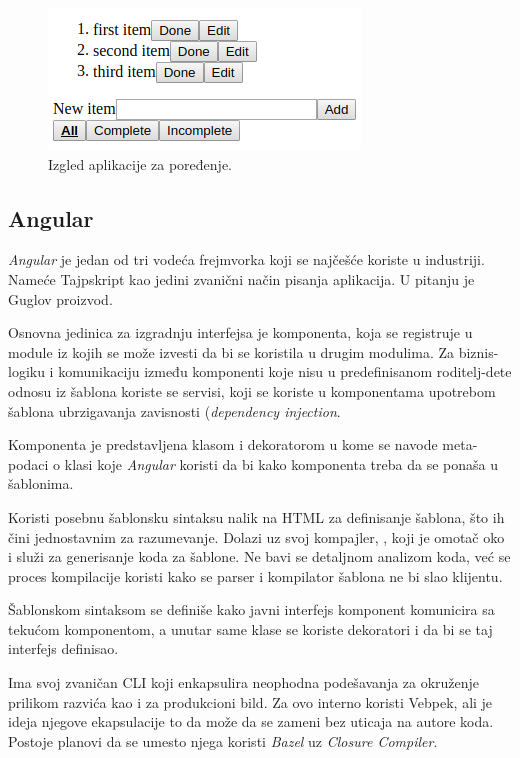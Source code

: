 \begin{figure}
  \centering
  \includegraphics[scale=0.5]{ch06/app.png}
  \caption{Izgled aplikacije za poređenje.}
  \label{fig:izgled-app}
\end{figure}

\subsection{Angular}

\textsl{Angular} je jedan od tri vodeća frejmvorka koji se najčešće koriste u industriji.
Nameće Tajpskript kao jedini zvanični način pisanja aplikacija.
U pitanju je Guglov proizvod.

Osnovna jedinica za izgradnju interfejsa je komponenta, koja se registruje u module iz kojih se može izvesti da bi se koristila u drugim modulima.
Za biznis-logiku i komunikaciju između komponenti koje nisu u predefinisanom roditelj-dete odnosu iz šablona koriste se servisi, koji se koriste u komponentama upotrebom šablona ubrzigavanja zavisnosti (\textsl{dependency injection}.

Komponenta je predstavljena klasom i dekoratorom  u kome se navode meta-podaci o klasi koje \textsl{Angular} koristi da bi  kako komponenta treba da se ponaša u šablonima.

Koristi posebnu šablonsku sintaksu nalik na HTML za definisanje šablona, što ih čini jednostavnim za razumevanje.
Dolazi uz svoj kompajler, , koji je omotač oko  i služi za generisanje koda za šablone.
Ne bavi se detaljnom analizom koda, već se proces kompilacije koristi kako se parser i kompilator šablona ne bi slao klijentu.

Šablonskom sintaksom se definiše kako javni interfejs komponent komunicira sa tekućom komponentom, a unutar same klase se koriste dekoratori  i  da bi se taj interfejs definisao.

Ima svoj zvaničan CLI koji enkapsulira neophodna podešavanja za okruženje prilikom razvića kao i za produkcioni bild.
Za ovo interno koristi Vebpek, ali je ideja njegove ekapsulacije to da može da se zameni bez uticaja na autore koda.
Postoje planovi da se umesto njega koristi \textsl{Bazel} uz \textsl{Closure Compiler}.

